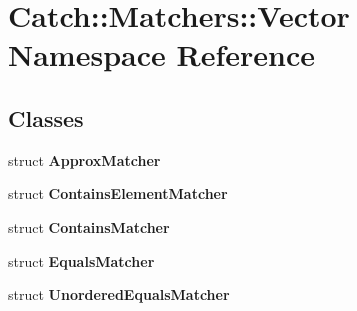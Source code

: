 \section{Catch\+::Matchers\+::Vector Namespace Reference}
\label{namespace_catch_1_1_matchers_1_1_vector}
\subsection*{Classes}
\begin{DoxyCompactItemize}
\item 
struct \textbf{ Approx\+Matcher}
\item 
struct \textbf{ Contains\+Element\+Matcher}
\item 
struct \textbf{ Contains\+Matcher}
\item 
struct \textbf{ Equals\+Matcher}
\item 
struct \textbf{ Unordered\+Equals\+Matcher}
\end{DoxyCompactItemize}
